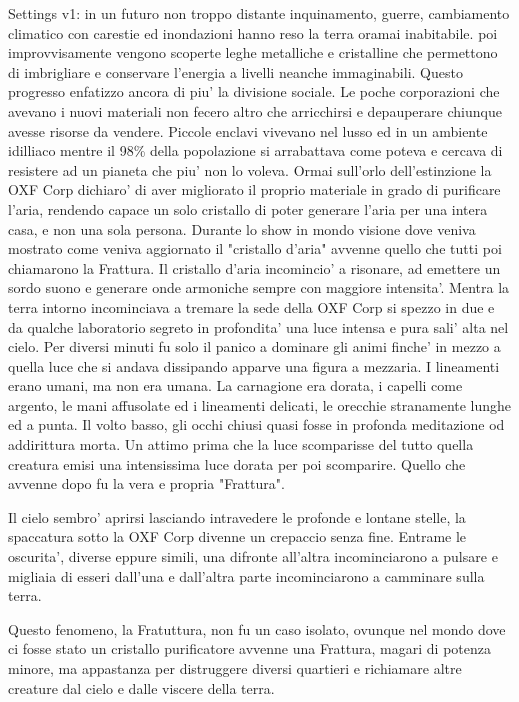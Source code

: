 \documentclass[12pt,a4paper,twoside,openany,twocolumn]{book}
\begin{document}
Settings v1:  in un futuro non troppo distante inquinamento, guerre, cambiamento climatico con carestie ed inondazioni hanno reso la terra oramai inabitabile. poi improvvisamente vengono scoperte leghe metalliche e cristalline che permettono di imbrigliare e conservare l'energia a livelli neanche immaginabili.
Questo progresso enfatizzo ancora di piu' la divisione sociale. Le poche corporazioni che avevano i nuovi materiali non fecero altro che arricchirsi e depauperare chiunque avesse risorse da vendere.
Piccole enclavi vivevano nel lusso ed in un ambiente idilliaco mentre il 98\% della popolazione si arrabattava come poteva e cercava di resistere ad un pianeta che piu' non lo voleva.
Ormai sull'orlo dell'estinzione la OXF Corp dichiaro' di aver migliorato il proprio materiale in grado di purificare l'aria, rendendo capace un solo cristallo di poter generare l'aria per una intera casa, e non una sola persona.
Durante lo show in mondo visione dove veniva mostrato come veniva aggiornato il "cristallo d'aria" avvenne quello che tutti poi chiamarono la Frattura. 
Il cristallo d'aria incomincio' a risonare, ad emettere un sordo suono e generare onde armoniche sempre con maggiore intensita'. Mentra la terra intorno incominciava a tremare la sede della OXF Corp si spezzo in due e da qualche laboratorio segreto in profondita' una luce intensa e pura sali' alta nel cielo. Per diversi minuti fu solo il panico a dominare gli animi finche' in mezzo a quella luce che si andava dissipando apparve una figura a mezzaria. I lineamenti erano umani, ma non era umana. La carnagione era dorata, i capelli come argento, le mani affusolate ed i lineamenti delicati, le orecchie stranamente lunghe ed a punta.
Il volto basso, gli occhi chiusi quasi fosse in profonda meditazione od addirittura morta.
Un attimo prima che la luce scomparisse del tutto quella creatura emisi una intensissima luce dorata per poi scomparire.
Quello che avvenne dopo fu la vera e propria "Frattura".

Il cielo sembro' aprirsi lasciando intravedere le profonde e lontane stelle, la spaccatura sotto la OXF Corp divenne un crepaccio senza fine.
Entrame le oscurita', diverse eppure simili, una difronte all'altra incominciarono a pulsare e migliaia di esseri dall'una e dall'altra parte incominciarono a camminare sulla terra.

Questo fenomeno, la Fratuttura, non fu un caso isolato, ovunque nel mondo dove ci fosse stato un cristallo purificatore avvenne una Frattura, magari di potenza minore, ma appastanza per distruggere diversi quartieri e richiamare altre creature dal cielo e dalle viscere della terra.
\end{document}
